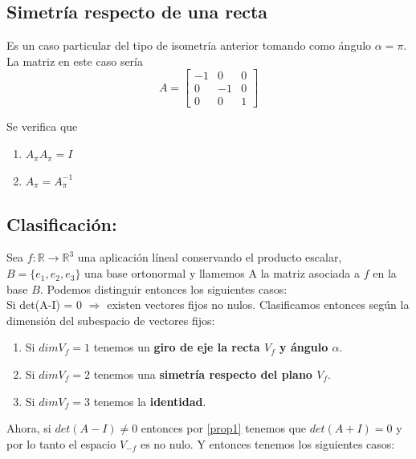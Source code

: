 \documentclass[10pt,a4paper]{article}
\theoremstyle{mystyle}
\begin{document}
\subsection{Simetría respecto de una recta}

Es un caso particular del tipo de isometría anterior tomando como ángulo $\alpha = \pi$. La matriz en este caso sería  
\[
A=
\begin{bmatrix}
-1 & 0 & 0 \\
0 &  -1  & 0 \\
0 & 0 & 1
\end{bmatrix}
\]


Se verifica que 

\begin{enumerate}
	\item
	$ A_\pi A_\pi = I $
	\item
	$ A_\pi = A_{\pi}^{-1} $
		
\end{enumerate}

\subsection{Clasificación:}

Sea $f:\mathbb{R} \rightarrow \mathbb{R}^3$ una aplicación líneal conservando el producto escalar, $B=\lbrace e_1,e_2,e_3 \rbrace$ una base ortonormal y llamemos A la matriz asociada a $f$ en la base $B$. Podemos distinguir entonces los siguientes casos:\\

Si det(A-I) = 0 $\Rightarrow$ existen vectores fijos no nulos. Clasificamos entonces según la dimensión del subespacio de vectores fijos:\\

\begin{enumerate}
\item Si $dimV_f = 1$ tenemos un \textbf{giro de eje la recta $V_f$ y ángulo $\alpha$}.
\item Si $dimV_f = 2$ tenemos una \textbf{simetría respecto del plano $V_f$}.
\item Si $dimV_f = 3$ tenemos la \textbf{identidad}.
\end{enumerate}

Ahora, si $det(A-I) \neq 0$ entonces por \ref{prop1} tenemos que $det(A+I) = 0$ y por lo tanto el espacio $V_{-f}$ es no nulo. Y entonces tenemos los siguientes casos:
\end{document}
